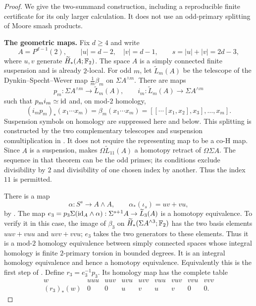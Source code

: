 \begin{proof}
We give the two-summand construction, including a reproducible
finite certificate for its only larger calculation. It does not
use an odd-primary splitting of Moore smash products.

\medskip\noindent
\textbf{The geometric maps.}
Fix $d\geq4$ and write
\[
 A=P^{d-1}(2),\qquad |u|=d-2,\quad |v|=d-1,\qquad
 s=|u|+|v|=2d-3,
\]
where $u,v$ generate $\widetilde H_*(A;\mathbb F_2)$.
The space $A$ is a simply connected finite suspension and is
already $2$-local. For odd $m$, let
$\widetilde L_m(A)$ be the telescope of the
Dynkin--Specht--Wever map $\frac1m\beta_m$ on
$\Sigma A^{\wedge m}$. There are maps
\[
 p_m:\Sigma A^{\wedge m}\longrightarrow\widetilde L_m(A),
 \qquad
 i_m:\widetilde L_m(A)\longrightarrow\Sigma A^{\wedge m}
\]
such that $p_mi_m\simeq\mathrm{id}$ and, on mod-$2$ homology,
\[
 (i_mp_m)_*(x_1\cdots x_m)
       =\beta_m(x_1\cdots x_m)
       =[[\cdots[x_1,x_2],x_3],\ldots,x_m].
 \tag{D.1.8.2}
\]
Suspension symbols on homology are suppressed here and below.
This splitting is constructed by the two complementary
telescopes and suspension comultiplication in
\cite[Section~2, pp.~3248--3249]{I_ChenWu2013}.
It does not require the representing map to be a co-H map.
Since $A$ is a suspension, \cite[Theorem~1.6]{I_Wu1998}
makes $\Omega\widetilde L_{11}(A)$ a homotopy retract of
$\Omega\Sigma A$. The sequence in that theorem can be the odd
primes; its conditions exclude divisibility by $2$ and divisibility
of one chosen index by another. Thus the index $11$ is permitted.

There is a map
\[
       \alpha:S^s\longrightarrow A\wedge A,
       \qquad \alpha_*(\iota_s)=uv+vu,
 \tag{D.1.8.3}
\]
by \cite[Proposition~2.1, pp.~3249--3250]{I_ChenWu2013}.
The map
$e_3=p_3\Sigma(\mathrm{id}_A\wedge\alpha):
\Sigma^{s+1}A\to\widetilde L_3(A)$
is a homotopy equivalence. To verify it in this case, the image
of $\beta_3$ on $\widetilde H_*(\Sigma A^{\wedge3};\mathbb F_2)$
has the two basis elements $uuv+vuu$ and $uvv+vvu$;
$e_3$ takes the two generators to these elements. Thus it is a
mod-$2$ homology equivalence between simply connected spaces
whose integral homology is finite $2$-primary torsion in bounded
degrees. It is an integral homology equivalence and hence a
homotopy equivalence. Equivalently this is the first step of
\cite[proof of Proposition~3.1, p.~3251]{I_ChenWu2013}.
Define $r_3=e_3^{-1}p_3$. Its homology map has the complete table
\[
\begin{array}{c|cccccccc}
 w&uuu&uuv&uvu&uvv&vuu&vuv&vvu&vvv\\ \hline
 (r_3)_*(w)&0&0&u&v&u&v&0&0.
\end{array}                                      \tag{D.1.8.4}
\]


\end{proof}
